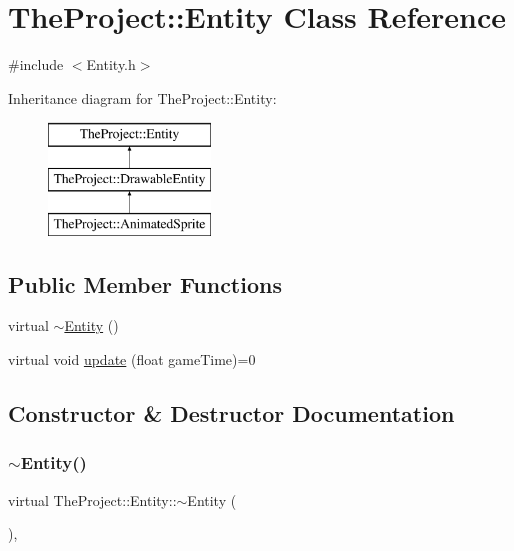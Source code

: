 \hypertarget{class_the_project_1_1_entity}{}\section{The\+Project\+:\+:Entity Class Reference}
\label{class_the_project_1_1_entity}


{\ttfamily \#include $<$Entity.\+h$>$}

Inheritance diagram for The\+Project\+:\+:Entity\+:\begin{figure}[H]
\begin{center}
\leavevmode
\includegraphics[height=3.000000cm]{class_the_project_1_1_entity}
\end{center}
\end{figure}
\subsection*{Public Member Functions}
\begin{DoxyCompactItemize}
\item 
virtual \mbox{\hyperlink{class_the_project_1_1_entity_aeecfd4ebad2d8d59d8945b68169add64}{$\sim$\+Entity}} ()
\item 
virtual void \mbox{\hyperlink{class_the_project_1_1_entity_a8ec5c42d4c918f5c98a482fb28b72da2}{update}} (float game\+Time)=0
\end{DoxyCompactItemize}


\subsection{Constructor \& Destructor Documentation}
\mbox{\label{class_the_project_1_1_entity_aeecfd4ebad2d8d59d8945b68169add64}} 
\subsubsection{\texorpdfstring{$\sim$\+Entity()}{~Entity()}}
{\footnotesize\ttfamily virtual The\+Project\+::\+Entity\+::$\sim$\+Entity (\begin{DoxyParamCaption}{ }\end{DoxyParamCaption})\hspace{0.3cm}{\ttfamily [inline]}, {\ttfamily [virtual]}}



